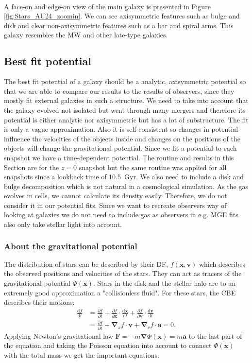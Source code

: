 \\A face-on and edge-on view of the main galaxy is presented in Figure \ref{fig:Stars_AU24_zoomin}. We can see axisymmetric features such as bulge and disk and clear non-axisymmetric features such as a bar and spiral arms. This galaxy resembles the \ac{MW} and other late-type galaxies.
\subsection{Best fit potential}\label{subsec:best_fit_pot}
The best fit potential of a galaxy should be a analytic, axisymmetric potential so that we are able  to compare our results to the results of observers, since they mostly fit external galaxies in such a structure. We need to take into account that the galaxy evolved not isolated but went through many mergers and therefore its potential is either analytic nor axisymmetric but has a lot of substructure. The fit is only a vague approximation. Also it is self-consistent so changes in potential influence the velocities of the objects inside and changes on the positions of the objects will change the gravitational potential. Since we fit a potential to each snapshot we have a time-dependent potential. The routine and results in this Section are for the $z=0$ snapshot but the same routine was applied for all snapshots since a lookback time of \SI{10.5}{Gyr}. We also need to include a disk and bulge decomposition which is not natural in a cosmological simulation. As the gas evolves in cells, we cannot calculate its density easily. Therefore, we do not consider it in our potential fits. Since we want to recreate observers way of looking at galaxies we do not need to include gas as observers in e.g. \ac{MGE} fits \citep{MGE...Monnet, MGE...Emsellem} also only take stellar light into account. 

\subsubsection{About the gravitational potential}\label{subsubsec:pot_theory}
The distribution of stars can be described by their \ac{DF}, $f(\mathbf{x}, \mathbf{v})$ which describes the observed positions and velocities of the stars. They can act as tracers of the gravitational potential $\Phi(\mathbf{x})$. Stars in the disk and the stellar halo are to an extremely good approximation a "collisionless fluid". For these stars, the \ac{CBE} describes their motions: 
\begin{align}\label{eq:CBE}
    \frac{\mathrm{d}f}{\mathrm{d}t} &= \frac{\partial f}{\partial t} + \frac{\partial f}{\partial \mathbf{x}} \cdot \frac{\mathrm{d}\mathbf{x}}{\mathrm{d}t} + \frac{\partial f}{\partial \mathbf{v}} \cdot \frac{\mathrm{d}\mathbf{v}}{\mathrm{d}t}\\
    &= \frac{\partial f}{\partial t} + \bm{\nabla}_x f \cdot \mathbf{v} + \bm{\nabla}_v f \cdot \mathbf{a} = 0.
\end{align}
Applying Newton's gravitational law $\mathbf{F} = -m\bm{\nabla}\Phi(\mathbf{x}) = m\mathbf{a}$ to the last part of the equation and taking the Poisson equation into account to connect $\Phi(\mathbf{x})$ with the total mass we get the important equations:

